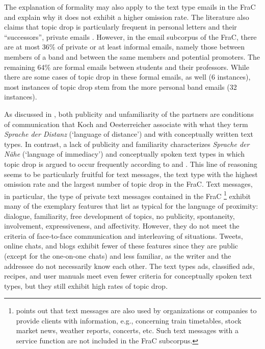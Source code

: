 The explanation of formality may also apply to the text type emails in the FraC and explain why it does not exhibit a higher omission rate.
The literature also claims that topic drop is particularly frequent in personal letters and their ``successors'', private emails \citep{fries1988,volodina2011,volodina.onea2012}.
However, in the email subcorpus of the FraC, there are at most 36\% of private or at least informal emails, namely those between members of a band and between the same members and potential promoters. 
The remaining 64\% are formal emails between students and their professors.
While there are some cases of topic drop in these formal emails, as well (6 instances), most instances of topic drop stem from the more personal band emails (32 instances).

\largerpage
As discussed in , both publicity and unfamiliarity of the partners are conditions of communication that Koch and Oesterreicher associate with what they term \textit{Sprache der Distanz} (`language of distance') \citep[23]{koch.oesterreicher1985} and with conceptually written text types.
In contrast, a lack of publicity and familiarity characterizes \textit{Sprache der Nähe} (`language of immediacy') and conceptually spoken text types in which topic drop is argued to occur frequently according to \citet{volodina2011} and \citet{volodina.onea2012}.
This line of reasoning seems to be particularly fruitful for text messages, the text type with the highest omission rate and the largest number of topic drop in the FraC.
Text messages, in particular, the type of private text messages contained in the FraC%
\footnote{\citet[13]{spycher2004} points out that text messages are also used by organizations or companies to provide clients with information, e.g., concerning train timetables, stock market news, weather reports, concerts, etc.
Such text messages with a service function are not included in the FraC subcorpus.}
%
exhibit many of the exemplary features that \citet[23]{koch.oesterreicher1985} list as typical for the language of proximity: dialogue, familiarity, free development of topics, no publicity, spontaneity, involvement, expressiveness, and affectivity.
However, they do not meet the criteria of face-to-face communication and interleaving of situations.
Tweets, online chats, and blogs exhibit fewer of these features since they are public (except for the one-on-one chats) and less familiar, as the writer and the addressee do not necessarily know each other.
The text types ads, classified ads, recipes, and user manuals meet even fewer criteria for conceptually spoken text types, but they still exhibit high rates of topic drop.

